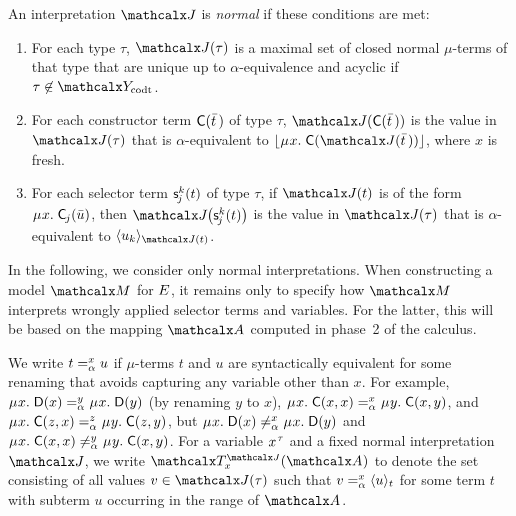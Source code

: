 
\begin{definition}
\afterDot%
\label{def:norm-interpretation}%
\rm
An interpretation $\J$ is \emph{normal} if these conditions are met:
\begin{enumerate}
\item
For each type $\tau$,
$\J( \tau )$ is a maximal set of closed normal $\mu$-terms of that type that are
unique up to $\alpha$-equivalence and acyclic if $\tau \not\in \Codata$.
\item
For each constructor term $\const{C}( \vec t \,)$ of type $\tau$,
$\J( \const{C}( \vec t \,) )$ is the value
in $\J( \tau )$ that is $\alpha$-equivalent to
$\nf{\MU x.\; \const{C}( \J( \vec t \,) )}$, where $x$ is fresh.
\item
For each selector term $\const s^k_{\negvthinspace j}( t )$ of type $\tau$, %
if $\J( t )$ is of the form $\MU x.\; \const{C}_{\negvthinspace j}( \vec u )$, 
then $\J\negvvthinspace\bigl( \const s^k_{\negvthinspace j}( t ) \bigr)$ is the value
in $\J( \tau )$ that is $\alpha$-equivalent to
$\interp{\J( t )}{u_k}$.
\end{enumerate}
\end{definition}

In the following, we consider only normal interpretations.
When constructing a model $\M$ for $\Ec$,
it remains only to specify how $\M$ interprets wrongly applied selector terms and variables.%
For the latter, this will be based on the mapping $\Val$ computed in phase~2 of the calculus.

We write $t \vsimv{x} u$ if $\mu$-terms $t$ and $u$ are syntactically equivalent
for some renaming that avoids capturing any variable other than $x$.
For example,
$\MU x.\; \const{D}( x ) \vsimv{y} \MU x.\; \const{D}( y )$
(by renaming $y$ to $x$),
$\MU x.\; \const{C}( x, x ) \vsimv{x} \MU y.\; \const{C}( x, y )$, and
$\MU x.\; \const{C}( z, x ) \vsimv{z} \MU y.\; \const{C}( z, y )$,
but
$\MU x.\; \const{D}( x ) \not\vsimv{x} \MU x.\; \const{D}( y )$ and
$\MU x.\; \const{C}( x, x ) \not\vsimv{y} \MU y.\; \const{C}( x, y )$.
For a variable $x\typ{\tau}$ and a fixed normal interpretation $\J$,
we write $\Terms^{\smash{\J}}_x( \Val )$ to denote the set consisting of all values
$v \in \J( \tau )$
such that $v \vsimv{x} \interp{t}{u}$ for some term $t$ with subterm $u$ occurring in the range of $\Val$.

